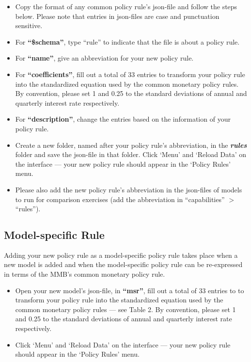 \documentclass[10pt,a4paper]{article}
\begin{document}
\begin{itemize}
\item Copy the format of any common policy rule’s json-file and follow the steps below. Please note that entries in json-files are case and punctuation sensitive.

\item For \textbf{“\$schema”}, type “rule” to indicate that the file is about a policy rule.

\item For \textbf{“name”}, give an abbreviation for your new policy rule.

\item For \textbf{“coefficients”}, fill out a total of 33 entries to transform your policy rule into the standardized equation used by the common monetary policy rules. By convention, please set 1 and 0.25 to the standard deviations of annual and quarterly interest rate respectively.

\item For \textbf{“description”}, change the entries based on the information of your policy rule.

\item Create a new folder, named after your policy rule's abbreviation, in the \textbf{\textit{rules}} folder and save the json-file in that folder. Click ‘Menu’ and ‘Reload Data’ on the interface — your new policy rule should appear in the ‘Policy Rules’ menu.

\item Please also add the new policy rule’s abbreviation in the json-files of models to run for comparison exercises (add the abbreviation in “capabilities” $>$ “rules”).
\end{itemize}

\subsection{Model-specific Rule}
\bigskip

Adding your new policy rule as a model-specific policy rule takes place when a new model is added and when the model-specific policy rule can be re-expressed in terms of the MMB’s common monetary policy rule.

\begin{itemize}
\item Open your new model’s json-file, in \textbf{“msr”}, fill out a total of 33 entries to to transform your policy rule into the standardized equation used by the common monetary policy rules — see Table 2. By convention, please set 1 and 0.25 to the standard deviations of annual and quarterly interest rate respectively.

\item Click ‘Menu’ and ‘Reload Data’ on the interface — your new policy rule should appear in the ‘Policy Rules’ menu.
\end{itemize}
\end{document}
